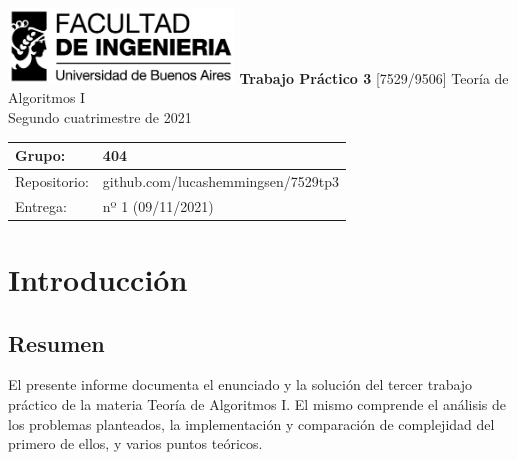 \documentclass[titlepage,a4paper]{article}
\begin{document}
\begin{titlepage} %
	\hfill\includegraphics[width=6cm]{img/logofiuba.jpg}
    \centering
    \vfill
    \Huge \textbf{Trabajo Práctico 3}
    \vskip2cm
    \Large [7529/9506] Teoría de Algoritmos I\\
    Segundo cuatrimestre de 2021
    \vfill
    \begin{tabular}{ | l | l | } %
      \hline
      Grupo: & 404 \\ \hline
      Repositorio: & github.com/lucashemmingsen/7529tp3 \\ \hline
      Entrega: & nº 1 (09/11/2021) \\ \hline
  	\end{tabular}
    \vfill
    
    \vfill
\end{titlepage}

\tableofcontents %
\newpage

\renewcommand{\thesection}{\Alph{section}}%
\setcounter{section}{8} %

\section{Introducción}\label{sec:intro}
\subsection{Resumen}
El presente informe documenta el enunciado y la solución del tercer trabajo práctico
de la materia Teoría de Algoritmos I. El mismo comprende el análisis de los problemas
planteados, la implementación y comparación de complejidad del primero de ellos, y
varios puntos teóricos.
\end{document}
